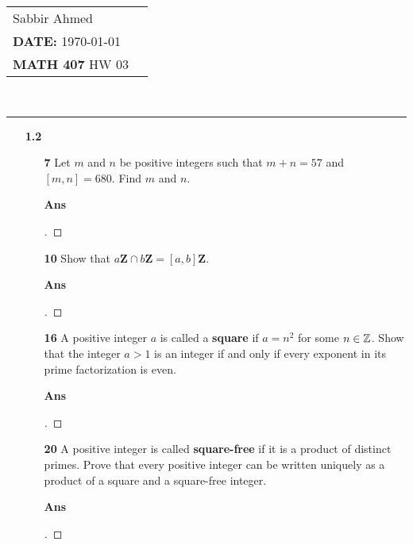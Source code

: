 \documentclass[paper=usletter, fontsize=12pt]{article}
\newcommand{\documentinfo}[5]{
    \begin{centering}
        \parbox{2in}{
        \begin{spacing}{1}
            \begin{flushleft}
                \begin{tabular}{l l}
                    #1 \\
                    #2 \\
                    #3 \\
                \end{tabular}\\
                \rule{\textwidth}{1pt}
            \end{flushleft}
        \end{spacing}
        }
    \end{centering}
}
\begin{document}
    \documentinfo{Sabbir Ahmed}{\textbf{DATE:} \today}{\textbf{MATH 407} HW 03}
    \vspace{-0.2in}

    \begin{itemize}

        \item[\textbf{1.2}]

        \begin{itemize}

            \item[\textbf{7}] Let $m$ and $n$ be positive integers such that $m
            + n = 57$ and $[m, n] = 680$. Find $m$ and $n$.
            \item[\textbf{Ans}]
            \begin{proof}[\unskip\nopunct]
            \end{proof}
            \vspace{0.2in}

            \item[\textbf{10}] Show that $a\textbf{Z} \cap b\textbf{Z} = [a,
            b]\textbf{Z}$.
            \item[\textbf{Ans}]
            \begin{proof}[\unskip\nopunct]
            \end{proof}
            \vspace{0.2in}

            \item[\textbf{16}] A positive integer $a$ is called a
            \textbf{square} if $a = n^2$ for some $n \in \mathbb{Z}$. Show that
            the integer $a > 1$ is an integer if and only if every exponent in
            its prime factorization is even.
            \item[\textbf{Ans}]
            \begin{proof}[\unskip\nopunct]
            \end{proof}
            \vspace{0.2in}

            \item[\textbf{20}] A positive integer is called \textbf{square-free} if it is a product of distinct primes. Prove that every
            positive integer can be written uniquely as a product of a square
            and a square-free integer.
            \item[\textbf{Ans}]
            \begin{proof}[\unskip\nopunct]
            \end{proof}
            \vspace{0.2in}

        \end{itemize}

    \end{itemize}
\end{document}
